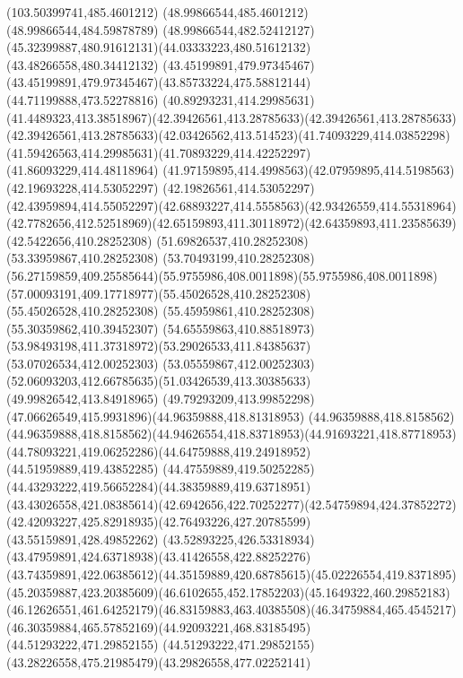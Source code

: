 {{\lineto(103.50399741,485.4601212)
\lineto(48.99866544,485.4601212)
\lineto(48.99866544,484.59878789)
\curveto(48.99866544,482.52412127)(45.32399887,480.91612131)(44.03333223,480.51612132)
\lineto(43.48266558,480.34412132)
\lineto(43.45199891,479.97345467)
\curveto(43.45199891,479.97345467)(43.85733224,475.58812144)(44.71199888,473.52278816)
\closepath
\moveto(40.89293231,414.29985631)
\curveto(41.4489323,413.38518967)(42.39426561,413.28785633)(42.39426561,413.28785633)
\curveto(42.39426561,413.28785633)(42.03426562,413.514523)(41.74093229,414.03852298)
\curveto(41.59426563,414.29985631)(41.70893229,414.42252297)(41.86093229,414.48118964)
\curveto(41.97159895,414.4998563)(42.07959895,414.5198563)(42.19693228,414.53052297)
\lineto(42.19826561,414.53052297)
\curveto(42.43959894,414.55052297)(42.68893227,414.5558563)(42.93426559,414.55318964)
\curveto(42.7782656,412.52518969)(42.65159893,411.30118972)(42.64359893,411.23585639)
\lineto(42.5422656,410.28252308)
\lineto(51.69826537,410.28252308)
\lineto(53.33959867,410.28252308)
\lineto(53.70493199,410.28252308)
\curveto(56.27159859,409.25585644)(55.9755986,408.0011898)(55.9755986,408.0011898)
\curveto(57.00093191,409.17718977)(55.45026528,410.28252308)(55.45026528,410.28252308)
\lineto(55.45959861,410.28252308)
\lineto(55.30359862,410.39452307)
\curveto(54.65559863,410.88518973)(53.98493198,411.37318972)(53.29026533,411.84385637)
\lineto(53.07026534,412.00252303)
\lineto(53.05559867,412.00252303)
\curveto(52.06093203,412.66785635)(51.03426539,413.30385633)(49.99826542,413.84918965)
\curveto(49.79293209,413.99852298)(47.06626549,415.9931896)(44.96359888,418.81318953)
\lineto(44.96359888,418.8158562)
\curveto(44.96359888,418.8158562)(44.94626554,418.83718953)(44.91693221,418.87718953)
\curveto(44.78093221,419.06252286)(44.64759888,419.24918952)(44.51959889,419.43852285)
\curveto(44.47559889,419.50252285)(44.43293222,419.56652284)(44.38359889,419.63718951)
\curveto(43.43026558,421.08385614)(42.6942656,422.70252277)(42.54759894,424.37852272)
\curveto(42.42093227,425.82918935)(42.76493226,427.20785599)(43.55159891,428.49852262)
\curveto(43.52893225,426.53318934)(43.47959891,424.63718938)(43.41426558,422.88252276)
\curveto(43.74359891,422.06385612)(44.35159889,420.68785615)(45.02226554,419.8371895)
\curveto(45.20359887,423.20385609)(46.6102655,452.17852203)(45.1649322,460.29852183)
\curveto(46.12626551,461.64252179)(46.83159883,463.40385508)(46.34759884,465.4545217)
\curveto(46.30359884,465.57852169)(44.92093221,468.83185495)(44.51293222,471.29852155)
\curveto(44.51293222,471.29852155)(43.28226558,475.21985479)(43.29826558,477.02252141)
}}
